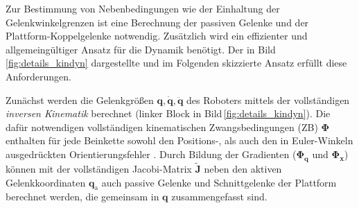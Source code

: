 \documentclass[fleqn,a4paper,10pt]{article}
\newcommand{\bm}[1]{\mathbf{#1}}
\renewcommand{\Phi}[1]{\varPhi{#1}}
\renewenvironment{figure}
  {\par\vspace{6pt}\noindent\minipage{\linewidth}}
  {\endminipage\par\vspace{6pt}}
\begin{document}
Zur Bestimmung von Nebenbedingungen wie der Einhaltung der Gelenkwinkelgrenzen ist eine Berechnung der passiven Gelenke und der Plattform-Koppelgelenke notwendig.
Zusätzlich wird ein effizienter und allgemeingültiger Ansatz für die Dynamik benötigt.
Der in Bild\,\ref{fig:details_kindyn} dargestellte und im Folgenden skizzierte  Ansatz erfüllt diese Anforderungen.

\begin{figure}
    \centering
    
    \label{fig:details_kindyn}
\end{figure}

Zunächst werden die Gelenkgrößen $\bm{q},\dot{\bm{q}},\ddot{\bm{q}}$ des Roboters mittels der vollständigen \emph{inversen Kinematik} berechnet (linker Block in Bild\,\ref{fig:details_kindyn}).
Die dafür notwendigen vollständigen kinematischen Zwangsbedingungen (\glqq{}ZB\grqq{}) $\bm{\Phi}$ enthalten für jede Beinkette sowohl den Positions-, als auch den in Euler-Winkeln ausgedrückten Orientierungsfehler \cite{SchapplerTapOrt2019c}.
Durch Bildung der Gradienten ($\bm{\Phi}_\bm{q}$ und $\bm{\Phi}_\bm{x}$) können mit der vollständigen Jacobi-Matrix $\tilde{\bm{J}}$ neben den aktiven Gelenkkoordinaten $\bm{q}_\mathrm{a}$ auch passive Gelenke und Schnittgelenke der Plattform berechnet werden, die gemeinsam in $\bm{q}$ zusammengefasst sind.
\end{document}

